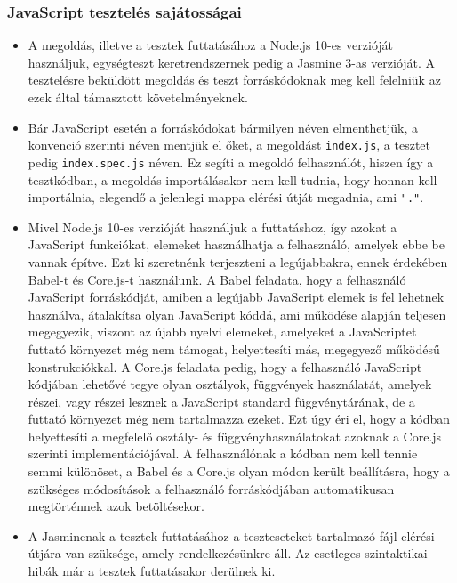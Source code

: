 \documentclass{elteikthesis}
\begin{document}
				\subsubsection{JavaScript tesztelés sajátosságai}
					\begin{itemize}
						\item A megoldás, illetve a tesztek futtatásához a Node.js 10-es verzióját használjuk, egységteszt keretrendszernek pedig a Jasmine 3-as verzióját. A tesztelésre beküldött megoldás és teszt forráskódoknak meg kell felelniük az ezek által támasztott követelményeknek.
						\item Bár JavaScript esetén a forráskódokat bármilyen néven elmenthetjük, a konvenció szerinti néven mentjük el őket, a megoldást \texttt{index.js}, a tesztet pedig \texttt{index.spec.js} néven. Ez segíti a megoldó felhasználót, hiszen így a tesztkódban, a megoldás importálásakor nem kell tudnia, hogy honnan kell importálnia, elegendő a jelenlegi mappa elérési útját megadnia, ami \texttt{"."}.
						\item Mivel Node.js 10-es verzióját használjuk a futtatáshoz, így azokat a JavaScript funkciókat, elemeket használhatja a felhasználó, amelyek ebbe be vannak építve. Ezt ki szeretnénk terjeszteni a legújabbakra, ennek érdekében Babel-t és Core.js-t használunk. A Babel feladata, hogy a felhasználó JavaScript forráskódját, amiben a legújabb JavaScript elemek is fel lehetnek használva, átalakítsa olyan JavaScript kóddá, ami működése alapján teljesen megegyezik, viszont az újabb nyelvi elemeket, amelyeket a JavaScriptet futtató környezet még nem támogat, helyettesíti más, megegyező működésű konstrukciókkal. A Core.js feladata pedig, hogy a felhasználó JavaScript kódjában lehetővé tegye olyan osztályok, függvények használatát, amelyek részei, vagy részei lesznek a JavaScript standard függvénytárának, de a futtató környezet még nem tartalmazza ezeket. Ezt úgy éri el, hogy a kódban helyettesíti a megfelelő osztály- és függvényhasználatokat azoknak a Core.js szerinti implementációjával. A felhasználónak a kódban nem kell tennie semmi különöset, a Babel és a Core.js olyan módon került beállításra, hogy a szükséges módosítások a felhasználó forráskódjában automatikusan megtörténnek azok betöltésekor.
						\item A Jasminenak a tesztek futtatásához a teszteseteket tartalmazó fájl elérési útjára van szüksége, amely rendelkezésünkre áll. Az esetleges szintaktikai hibák már a tesztek futtatásakor derülnek ki.
					\end{itemize}
\end{document}
